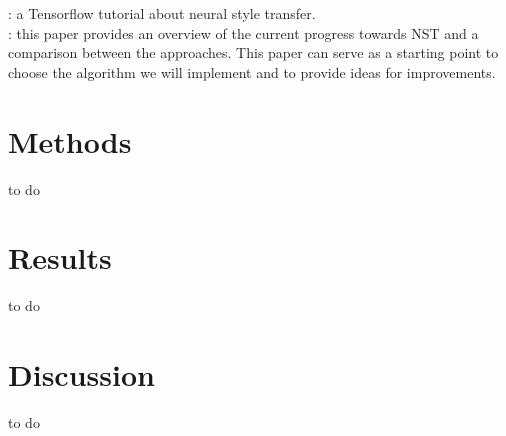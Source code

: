 \documentclass[twocolumn,superscriptaddress,aps]{revtex4-1}
\begin{document}
    \cite{tensorflow-style-transfer} : a Tensorflow tutorial about neural style transfer.\\
    
    \cite{1705-04058} : this paper provides an overview of the current progress towards NST and a comparison between the approaches. This paper can serve as a starting point to choose the algorithm we will implement and to provide ideas for improvements.
    
    
    
    
    \section{Methods}
    
    to do
    
    
    
    
    \section{Results}
    
    to do
    
    
    
    
    \section{Discussion}
    
    to do
    
    
    
    
    
    \nocite{*}
\end{document}
